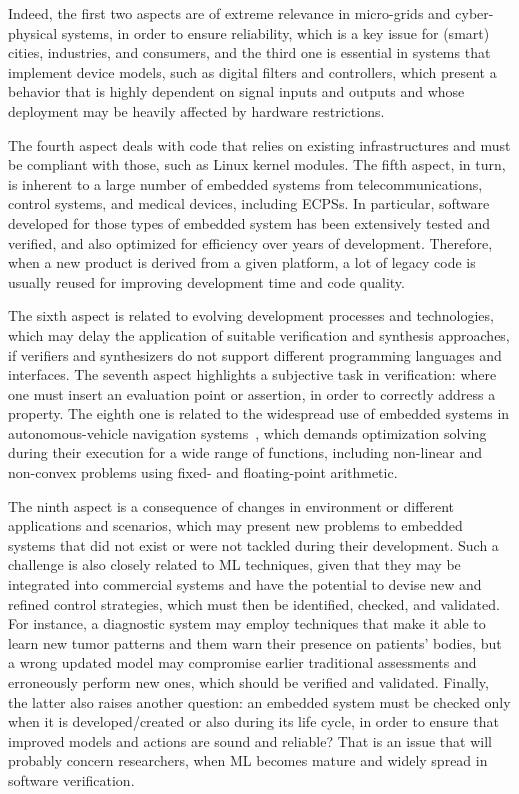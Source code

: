 \documentclass{cta-author}
\begin{document}
Indeed, the first two aspects are of extreme relevance in micro-grids and cyber-physical systems, in order to ensure reliability, which is a key issue for (smart) cities, industries, and consumers, and the third one is essential in systems that implement device models, such as digital filters and controllers, which present a behavior that is highly dependent on signal inputs and outputs and whose deployment may be heavily affected by hardware restrictions. 

The fourth aspect deals with code that relies on existing infrastructures and must be compliant with those, such as Linux kernel modules. The fifth aspect, in turn, is inherent to a large number of embedded systems from  telecommunications, control systems, and medical devices, including ECPSs. In particular, software developed for those types of embedded system has been extensively tested and verified, and also optimized for efficiency over years of development. Therefore, when a new product is derived from a given platform, a lot of legacy code is usually reused for improving development time and code quality. 

The sixth aspect is related to evolving development processes and technologies, which may delay the application of suitable verification and synthesis approaches, if verifiers and synthesizers do not support different programming languages and interfaces. The seventh aspect highlights a subjective task in verification: where one must insert an evaluation point or assertion, in order to correctly address a property. The eighth one is related to the widespread use of embedded systems in autonomous-vehicle navigation systems~\cite{Adouane16}, which demands optimization solving during their execution for a wide range of functions, including non-linear and non-convex problems using fixed- and floating-point arithmetic. 

The ninth aspect is a consequence of changes in environment or different applications and scenarios, which may present new problems to embedded systems that did not exist or were not tackled during their development. Such a challenge is also closely related to ML techniques, given that they may be integrated into commercial systems and have the potential to devise new and refined control strategies, which must then be identified, checked, and validated. For instance, a diagnostic system may employ techniques that make it able to learn new tumor patterns and them warn their presence on patients' bodies, but a wrong updated model may compromise earlier traditional assessments and erroneously perform new ones, which should be verified and validated. Finally, the latter also raises another question: an embedded system must be checked only when it is developed/created or also during its life cycle, in order to ensure that improved models and actions are sound and reliable? That is an issue that will probably concern researchers, when ML becomes mature and widely spread in software verification.
\end{document}

